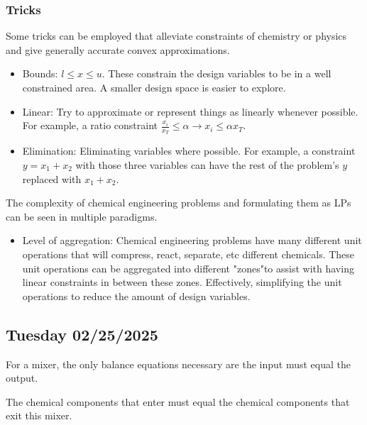 \subsubsection{Tricks}
Some tricks can be employed that alleviate constraints of chemistry or physics and give generally accurate convex approximations.
\begin{itemize}
    \item Bounds: $l \leq x \leq u$. These constrain the design variables to be in a well constrained area. A smaller design space is easier to explore.
    \item Linear: Try to approximate or represent things as linearly whenever possible. For example, a ratio constraint $\frac{x_i}{x_T} \leq \alpha \rightarrow x_i \leq \alpha x_T$.
    \item Elimination: Eliminating variables where possible. For example, a constraint $y = x_1 + x_2$ with those three variables can have the rest of the problem's $y$ replaced with $x_1 + x_2$.
\end{itemize}
The complexity of chemical engineering problems and formulating them as LPs can be seen in multiple paradigms.
\begin{itemize}
    \item Level of aggregation: Chemical engineering problems have many different unit operations that will compress, react, separate, etc different chemicals. These unit operations can be aggregated into different "zones"to assist with having linear constraints in between these zones. Effectively, simplifying the unit operations to reduce the amount of design variables.
\end{itemize}

\subsection{Tuesday 02/25/2025}
For a mixer, the only balance equations necessary are the input must equal the output.
\begin{center}
\end{center}
The chemical components that enter must equal the chemical components that exit this mixer.

